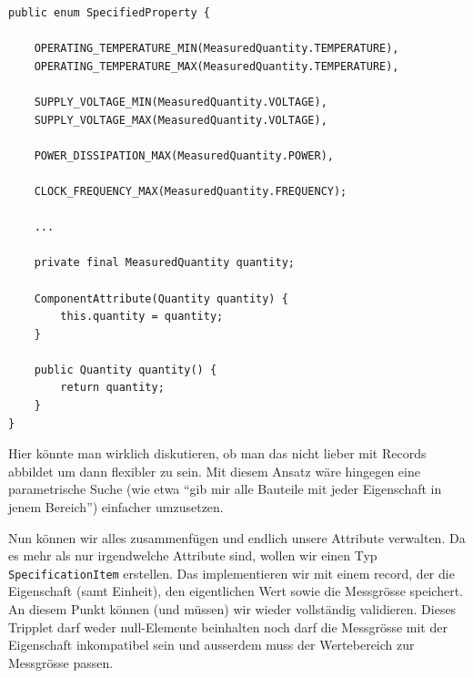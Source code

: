 \begin{listing}[H]
\begin{verbatim}
public enum SpecifiedProperty {

    OPERATING_TEMPERATURE_MIN(MeasuredQuantity.TEMPERATURE),
    OPERATING_TEMPERATURE_MAX(MeasuredQuantity.TEMPERATURE),

    SUPPLY_VOLTAGE_MIN(MeasuredQuantity.VOLTAGE),
    SUPPLY_VOLTAGE_MAX(MeasuredQuantity.VOLTAGE),
    
    POWER_DISSIPATION_MAX(MeasuredQuantity.POWER),

    CLOCK_FREQUENCY_MAX(MeasuredQuantity.FREQUENCY);
    
    ...

    private final MeasuredQuantity quantity;

    ComponentAttribute(Quantity quantity) {
        this.quantity = quantity;
    }

    public Quantity quantity() {
        return quantity;
    }
}
\end{verbatim}
\caption{Gekürzt dargestelltes SpecifiedProperty-enum}
\label{lst:SpecifiedPropertyEnum}
\end{listing}

Hier könnte man wirklich diskutieren, ob man das nicht lieber mit
Records abbildet um dann flexibler zu sein. Mit diesem Ansatz
wäre hingegen eine parametrische Suche (wie etwa ``gib mir alle Bauteile
mit jeder Eigenschaft in jenem Bereich'') einfacher umzusetzen.

Nun können wir alles zusammenfügen und endlich unsere Attribute verwalten. Da es
mehr als nur irgendwelche Attribute sind, wollen wir einen Typ 
\texttt{SpecificationItem} erstellen.
Das implementieren wir mit einem record, der die Eigenschaft (samt Einheit), 
den eigentlichen Wert sowie die Messgrösse speichert. An diesem Punkt können
(und müssen) wir wieder vollständig validieren. Dieses Tripplet darf weder
null-Elemente beinhalten noch darf die Messgrösse mit der Eigenschaft
inkompatibel sein und ausserdem muss der Wertebereich zur Messgrösse passen.

